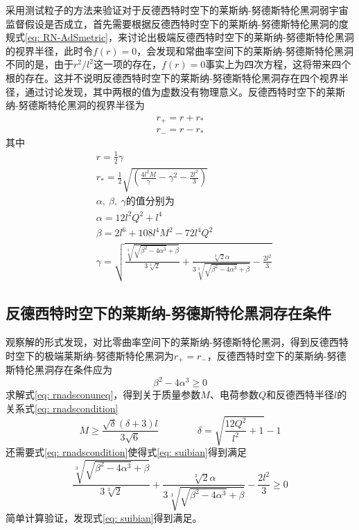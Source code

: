 采用测试粒子的方法来验证对于反德西特时空下的莱斯纳-努德斯特伦黑洞弱宇宙监督假设是否成立，首先需要根据反德西特时空下的莱斯纳-努德斯特伦黑洞的度规式\eqref{eq: RN-AdSmetric}，来讨论出极端反德西特时空下的莱斯纳-努德斯特伦黑洞的视界半径，此时令$ f(r)=0 $，会发现和常曲率空间下的莱斯纳-努德斯特伦黑洞不同的是，由于$r^2/l^2$这一项的存在，$ f(r)=0 $事实上为四次方程，这将带来四个根的存在。这并不说明反德西特时空下的莱斯纳-努德斯特伦黑洞存在四个视界半径，通过讨论发现，其中两根的值为虚数没有物理意义。反德西特时空下的莱斯纳-努德斯特伦黑洞的视界半径为
\begin{align}
    r_+=r + r_* \label{eq: rnr+} \\
    r_-=r-r_* \label{eq: rnr-} 
\end{align}
其中
\begin{align*}
    &r = \frac{1}{2} \gamma \\
    &r_* = \frac{1}{2} \sqrt{(\frac{4 l^2
    M}{\gamma}-\gamma^2-\frac{2 l^2}{3})}  \\
    &\alpha,\ \beta,\ \gamma \text{的值分别为} \\
    &\alpha =12 l^2 Q^2+l^4 \\ 
    &\beta =2 l^6 + 108 l^4 M^2 - 72 l^4 Q^2 \\
    &\gamma = \sqrt{\frac{\sqrt[3]{\sqrt{\beta^2-4 \alpha^3}+\beta}}{3\sqrt[3]{2}}+\frac{\sqrt[3]{2} \alpha}{3 \sqrt[3]{\sqrt{\beta^2-4\alpha^3}+\beta}}-\frac{2 l^2}{3}} 
\end{align*}

\subsection{反德西特时空下的莱斯纳-努德斯特伦黑洞存在条件}
观察解的形式发现，对比零曲率空间下的莱斯纳-努德斯特伦黑洞，得到反德西特时空下的极端莱斯纳-努德斯特伦黑洞为$r_+=r_-$，反德西特时空下的莱斯纳-努德斯特伦黑洞存在条件应为
\begin{equation}\label{eq: rnadsconuneq}
    \beta^2-4\alpha^3 \geq 0
\end{equation}
求解式\eqref{eq: rnadsconuneq}，得到关于质量参数$M$、电荷参数$Q$和反德西特半径$l$的关系式\eqref{eq: rnadscondition}
\begin{equation}\label{eq: rnadscondition}
    M \geq \frac{\sqrt{\delta } (\delta +3) l}{3 \sqrt{6}} \qquad\qquad  \delta= \sqrt{\frac{12 Q^2}{l^2}+1}-1 
\end{equation}
还需要式\eqref{eq: rnadscondition}使得式\eqref{eq: suibian}得到满足
\begin{equation}\label{eq: suibian}
    \frac{\sqrt[3]{\sqrt{\beta^2-4 \alpha^3}+\beta}}{3\sqrt[3]{2}}+\frac{\sqrt[3]{2} \alpha}{3 \sqrt[3]{\sqrt{\beta^2-4\alpha^3}+\beta}}-\frac{2 l^2}{3} \geq 0
\end{equation}
简单计算验证，发现式\eqref{eq: suibian}得到满足。

